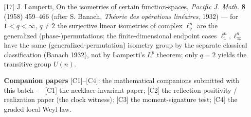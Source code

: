 \documentclass[11pt]{article}
\begin{document}
[17] J. Lamperti, On the isometries of certain function-spaces, \emph{Pacific J. Math.} \textbf{8} (1958) 459–466 (after S. Banach, \emph{Théorie des opérations linéaires}, 1932) — for $1 < q < \infty$, $q \neq 2$ the surjective linear isometries of complex $\ell^n_q$ are the generalized (phase-)permutations; the finite-dimensional endpoint cases $\ell^n_1, \ell^n_\infty$ have the same (generalized-permutation) isometry group by the separate classical classification (Banach 1932), not by Lamperti's $L^p$ theorem; only $q = 2$ yields the transitive group $U(n)$.

\textbf{Companion papers} [C1]–[C4]: the mathematical companions submitted with this batch — [C1] the necklace-invariant paper; [C2] the reflection-positivity / realization paper (the clock witness); [C3] the moment-signature test; [C4] the graded local Weyl law.
\end{document}
